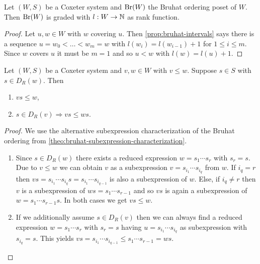 \begin{coro}
	Let $(W,S)$ be a Coxeter system and $\operatorname{Br}(W)$ the Bruhat ordering poset of $W$. Then $\operatorname{Br}(W)$ is graded with $l:W \to \mathbb{N}$ as rank function.

	\begin{proof}
		Let $u,w \in W$ with $w$ covering $u$. Then \ref{prop:bruhat-intervals} says there is a sequence $u = w_0 < \ldots < w_m = w$ with $l(w_i) = l(w_{i-1}) + 1$ for $1 \leq i \leq m$. Since $w$ covers $u$ it must be $m = 1$ and so $u < w$ with $l(w) = l(u) + 1$.
	\end{proof}
\end{coro}

\begin{theo}
	Let $(W,S)$ be a Coxeter system and $v,w \in W$ with $v \leq w$. Suppose $s \in S$ with $s \in D_R(w)$. Then
	\begin{enumerate}
		\item $vs \leq w$,
		\item $s \in D_R(v) \Rightarrow vs \leq ws$.
	\end{enumerate}

	\begin{proof}
		We use the alternative subexpression characterization of the Bruhat ordering from \ref{theo:bruhat-subexpression-characterization}.
		\begin{enumerate}
			\item Since $s \in D_R(w)$ there exists a reduced expression $w = s_1 \cdots s_r$ with $s_r = s$. Due to $v \leq w$ we can obtain $v$ as a subexpression $v = s_{i_1} \cdots s_{i_q}$ from $w$. If $i_q = r$ then $vs = s_{i_1} \cdots s_{i_q} s = s_{i_1} \cdots s_{i_{q - 1}}$ is also a subexpression of $w$. Else, if $i_q \neq r$ then $v$ is a subexpression of $ws = s_1 \cdots s_{r-1}$ and so $vs$ is again a subexpression of $w = s_1 \cdots s_{r-1} s$. In both cases we get $vs \leq w$.
			\item If we additionally assume $s \in D_R(v)$ then we can always find a reduced expression $w = s_1 \cdots s_r$ with $s_r = s$ having $u = s_{i_1} \cdots s_{i_q}$ as subexpression with $s_{i_q} = s$. This yields $vs = s_{i_1} \cdots s_{i_{q-1}} \leq s_1 \cdots s_{r-1} = ws$. \qedhere
		\end{enumerate}
	\end{proof}
\end{theo}


